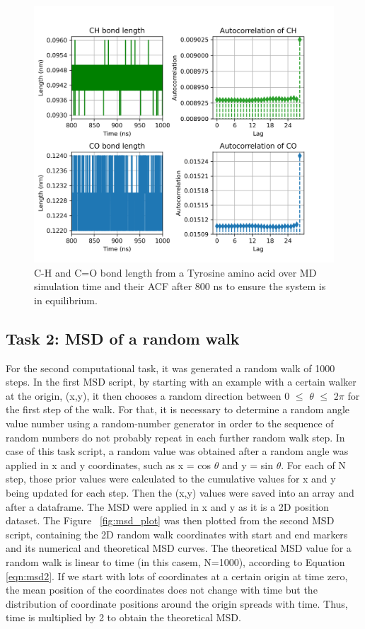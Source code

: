 \documentclass{article}
\begin{document}
\begin{figure}[H]
\includegraphics[width=\linewidth]{CO_CH_length_acf_plot.png}
\caption{C-H and C=O bond length from a Tyrosine amino acid over MD simulation time and their ACF after 800 ns to ensure the system is in equilibrium.}
\label{fig:acf_plot}
\end{figure}

\subsection{Task 2: MSD of a random walk}

For the second computational task, it was generated a random walk of 1000 steps. In the first MSD script, by starting with an example with a certain walker at the origin, (x,y), it then chooses a random direction between 0 $\leq$ $\theta$ $\leq$ $2\pi$ for the first step of the walk. For that, it is necessary to determine a random angle value number using a random-number generator in order to the sequence of random numbers do not probably repeat in each further random walk step. In case of this task script, a random value was obtained after a random angle was applied in x and y coordinates, such as x = cos $\theta$ and y = sin $\theta$. For each of N step, those prior values were calculated to the cumulative values for x and y being updated for each step. Then the (x,y) values were saved into an array and after a dataframe. The MSD were applied in x and y as it is a 2D position dataset. The Figure ~\ref{fig:msd_plot} was then plotted from the second MSD script, containing the 2D random walk coordinates with start and end markers and its numerical and theoretical MSD curves. The theoretical MSD value for a random walk is linear to time (in this casem, N=1000), according to Equation \ref{eqn:msd2}. If we start with lots of coordinates at a certain origin at time zero, the mean position of the coordinates does not change with time but the distribution of coordinate positions around the origin spreads with time. Thus, time is multiplied by 2 to obtain the theoretical MSD.
\end{document}
